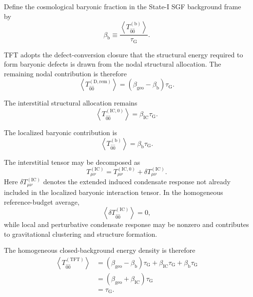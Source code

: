Define the cosmological baryonic fraction in the State-I SGF background frame by
\begin{equation}
    \beta_{\mathrm{b}} \equiv \frac{ \left\langle T_{\hat{0}\hat{0}}^{(\mathrm{b})} \right\rangle }{ \tau_{\mathrm{G}} }.
\end{equation}

TFT adopts the defect-conversion closure that the structural energy required to form baryonic defects is drawn from the nodal structural allocation. The remaining nodal contribution is therefore
\begin{equation}
    \left\langle T_{\hat{0}\hat{0}}^{(\mathrm{D},\mathrm{rem})} \right\rangle = \left( \beta_{\mathrm{geo}} - \beta_{\mathrm{b}} \right) \tau_{\mathrm{G}}.
\end{equation}

The interstitial structural allocation remains
\begin{equation}
    \left\langle T_{\hat{0}\hat{0}}^{(\mathrm{IC},0)} \right\rangle = \beta_{\mathrm{IC}}\tau_{\mathrm{G}}.
\end{equation}

The localized baryonic contribution is
\begin{equation}
    \left\langle T_{\hat{0}\hat{0}}^{(\mathrm{b})} \right\rangle = \beta_{\mathrm{b}}\tau_{\mathrm{G}}.
\end{equation}

The interstitial tensor may be decomposed as
\begin{equation}
    T_{\mu\nu}^{(\mathrm{IC})} = T_{\mu\nu}^{(\mathrm{IC},0)} + \delta T_{\mu\nu}^{(\mathrm{IC})}.
\end{equation}
Here $\delta T_{\mu\nu}^{(\mathrm{IC})}$ denotes the extended induced condensate response not already included in the localized baryonic interaction tensor. In the homogeneous reference-budget average,
\begin{equation}
    \left\langle \delta T_{\hat{0}\hat{0}}^{(\mathrm{IC})} \right\rangle = 0,
\end{equation}
while local and perturbative condensate response may be nonzero and contributes to gravitational clustering and structure formation.

The homogeneous closed-background energy density is therefore
\begin{equation}
\begin{aligned}
    \left\langle T_{\hat{0}\hat{0}}^{(\mathrm{TFT})} \right\rangle &= \left( \beta_{\mathrm{geo}} - \beta_{\mathrm{b}} \right) \tau_{\mathrm{G}} + \beta_{\mathrm{IC}}\tau_{\mathrm{G}} + \beta_{\mathrm{b}}\tau_{\mathrm{G}} \\[3pt]
    &= \left( \beta_{\mathrm{geo}} + \beta_{\mathrm{IC}} \right) \tau_{\mathrm{G}} \\[3pt]
    &= \tau_{\mathrm{G}}.
\end{aligned}
\end{equation}

